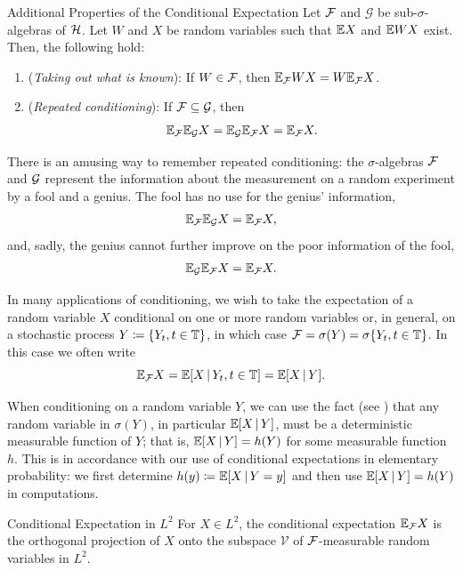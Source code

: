 \begin{thm}{Additional Properties of the Conditional Expectation}{}
Let \(\mathcal{F}\) and \(\mathcal{G}\) be sub-\(\sigma\)-algebras of \(\mathcal{H}\). Let \(W\) and \(X\) be random variables such that \(\mathbb{E} X\) and \(\mathbb{E} WX\) exist. Then, the following hold:
\begin{enumerate}
    \item (\textit{Taking out what is known}): If \(W \in \mathcal{F}\), then \(\mathbb{E}_{\mathcal{F}} WX = W \mathbb{E}_{\mathcal{F}} X\).
    \item (\textit{Repeated conditioning}): If \(\mathcal{F} \subseteq \mathcal{G}\), then
    \begin{equation}
        \mathbb{E}_{\mathcal{F}} \mathbb{E}_{\mathcal{G}} X = \mathbb{E}_{\mathcal{G}} \mathbb{E}_{\mathcal{F}} X = \mathbb{E}_{\mathcal{F}} X.
        \label{eq:TowerProperty}
    \end{equation}
\end{enumerate}
\end{thm}

There is an amusing way to remember repeated conditioning: the \(\sigma\)-algebras \(\mathcal{F}\) and \(\mathcal{G}\) represent the information about the measurement on a random experiment by a fool and a genius. The fool has no use for the genius' information,
\[
    \mathbb{E}_{\mathcal{F}}\mathbb{E}_{\mathcal{G}} X = \mathbb{E}_{\mathcal{F}} X,
\]
and, sadly, the genius cannot further improve on the poor information of the fool,
\[
    \mathbb{E}_{\mathcal{G}}\mathbb{E}_{\mathcal{F}} X = \mathbb{E}_{\mathcal{F}} X.
\]

In many applications of conditioning, we wish to take the expectation of a random variable \(X\) conditional on one or more random variables or, in general, on a stochastic process \(Y \coloneqq \{Y_t, t \in \mathbb{T}\}\), in which case \(\mathcal{F} = \sigma(Y) = \sigma\{Y_t, t \in \mathbb{T}\}\). In this case we often write
\[
    \mathbb{E}_{\mathcal{F}} X = \mathbb{E}[X \,\vert\, Y_t, t \in \mathbb{T}] = \mathbb{E}[X \,\vert\, Y].
\]

When conditioning on a random variable \(Y\), we can use the fact (see ) that any random variable in \(\sigma(Y)\), in particular \(\mathbb{E}[X \,\vert\, Y]\), must be a deterministic measurable function of \(Y\); that is, \(\mathbb{E}[X \,\vert\, Y] = h(Y)\) for some measurable function \(h\). This is in accordance with our use of conditional expectations in elementary probability: we first determine \(h(y) \coloneqq \mathbb{E}[X \,\vert\, Y = y]\) and then use \(\mathbb{E}[X \,\vert\, Y] = h(Y)\) in computations.


\begin{thm}{Conditional Expectation in \(L^2\)}{}
For \(X \in L^2\), the conditional expectation \(\mathbb{E}_{\mathcal{F}} X\) is the orthogonal projection of \(X\) onto the subspace \(\mathcal{V}\) of \(\mathcal{F}\)-measurable random variables in \(L^2\).
\end{thm}

